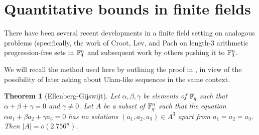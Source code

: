 \documentclass{report}
\newtheorem{theorem}{Theorem}[section]
\theoremstyle{remark}
\numberwithin{equation}{section}
\begin{document}

  


\section{Quantitative bounds in finite fields}

There have been several recent developments in a finite field setting
on analogous problems (specifically, the work of Croot, Lev, and Pach
\cite{croot:preprint} on length-3 arithmetic progression-free sets
in $\mathbb{F}_4^n$ and subsequent work by others \cite{ellenberg:preprint}
pushing it to $\mathbb{F}_3^n$.

We will recall the method used here by outlining the proof in
\cite{ellenberg:preprint}, in view of the possibility of later asking
about Ulam-like sequences in the same context.

\begin{theorem}[Ellenberg-Gijswijt]
Let $\alpha, \beta, \gamma$ be elements of $\mathbb{F}_q$ such that
$\alpha+\beta+\gamma = 0$ and $\gamma \neq 0$.  Let $A$ be a subset of
$\mathbb{F}_q^n$ such that the equation $\alpha a_1 + \beta a_2 + \gamma a_3
= 0$ has no solutions $(a_1, a_2, a_3) \in A^3$ apart from $a_1 = a_2
= a_3$.  Then $|A| = o(2.756^n)$.
\end{theorem}
\end{document}
